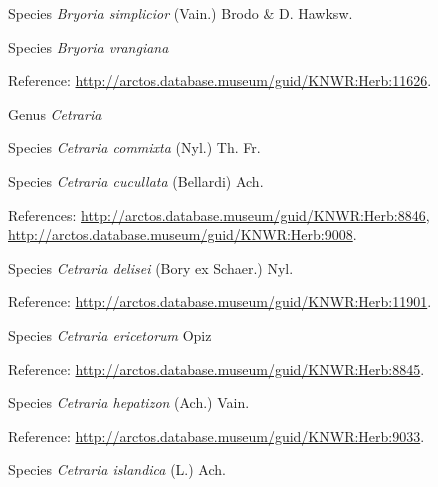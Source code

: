 \documentclass[9pt, article]{memoir}
\begin{document}
\begin{multicols}{2}
\vspace{6pt}\noindent\hspace{36pt}Species \textit{Bryoria simplicior} (Vain.) Brodo \& D. Hawksw.


\vspace{6pt}\noindent\hspace{36pt}Species \textit{Bryoria vrangiana}


\vspace{6pt}Reference: 
\url{http://arctos.database.museum/guid/KNWR:Herb:11626}.

\vspace{6pt}\noindent\hspace{30pt}Genus \textit{Cetraria}


\vspace{6pt}\noindent\hspace{36pt}Species \textit{Cetraria commixta} (Nyl.) Th. Fr.


\vspace{6pt}\noindent\hspace{36pt}Species \textit{Cetraria cucullata} (Bellardi) Ach.


\vspace{6pt}References: 
\url{http://arctos.database.museum/guid/KNWR:Herb:8846}, 
\url{http://arctos.database.museum/guid/KNWR:Herb:9008}.

\vspace{6pt}\noindent\hspace{36pt}Species \textit{Cetraria delisei} (Bory ex Schaer.) Nyl.


\vspace{6pt}Reference: 
\url{http://arctos.database.museum/guid/KNWR:Herb:11901}.

\vspace{6pt}\noindent\hspace{36pt}Species \textit{Cetraria ericetorum} Opiz


\vspace{6pt}Reference: 
\url{http://arctos.database.museum/guid/KNWR:Herb:8845}.

\vspace{6pt}\noindent\hspace{36pt}Species \textit{Cetraria hepatizon} (Ach.) Vain.


\vspace{6pt}Reference: 
\url{http://arctos.database.museum/guid/KNWR:Herb:9033}.

\vspace{6pt}\noindent\hspace{36pt}Species \textit{Cetraria islandica} (L.) Ach.



\end{multicols}
\end{document}
